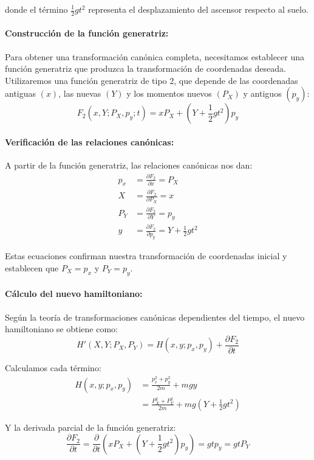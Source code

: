\documentclass[12pt]{article}
\begin{document}
\begin{enumerate}
  donde el término $\frac{1}{2}gt^2$ representa el desplazamiento del ascensor respecto al suelo. 

  \paragraph{Construcción de la función generatriz:}
  Para obtener una transformación canónica completa, necesitamos establecer una función generatriz que produzca la transformación de coordenadas deseada. Utilizaremos una función generatriz de tipo 2, que depende de las coordenadas antiguas $(x)$, las nuevas $(Y)$ y los momentos nuevos $(P_X)$ y antiguos $(p_y)$:
  \[
  F_2(x,Y;P_X,p_y;t) = xP_X + \left(Y + \frac{1}{2}gt^2\right)p_y
  \]

  \paragraph{Verificación de las relaciones canónicas:}
  A partir de la función generatriz, las relaciones canónicas nos dan:
  \begin{align}
  p_x &= \frac{\partial F_2}{\partial x} = P_X \\
  X &= \frac{\partial F_2}{\partial P_X} = x \\
  P_Y &= \frac{\partial F_2}{\partial Y} = p_y \\
  y &= \frac{\partial F_2}{\partial p_y} = Y + \frac{1}{2}gt^2
  \end{align}

  Estas ecuaciones confirman nuestra transformación de coordenadas inicial y establecen que $P_X = p_x$ y $P_Y = p_y$.

  \paragraph{Cálculo del nuevo hamiltoniano:}
  Según la teoría de transformaciones canónicas dependientes del tiempo, el nuevo hamiltoniano se obtiene como:
  \[
  H'(X,Y;P_X,P_Y) = H(x,y;p_x,p_y) + \frac{\partial F_2}{\partial t}
  \]

  Calculamos cada término:
  \begin{align}
  H(x,y;p_x,p_y) &= \frac{p_x^2+p_y^2}{2m} + mgy \\
  &= \frac{P_X^2+P_Y^2}{2m} + mg\left(Y + \frac{1}{2}gt^2\right)
  \end{align}

  Y la derivada parcial de la función generatriz:
  \[
  \frac{\partial F_2}{\partial t} = \frac{\partial}{\partial t}\left(xP_X + \left(Y + \frac{1}{2}gt^2\right)p_y\right) = gtp_y = gtP_Y
  \]


\end{enumerate}
\end{document}
